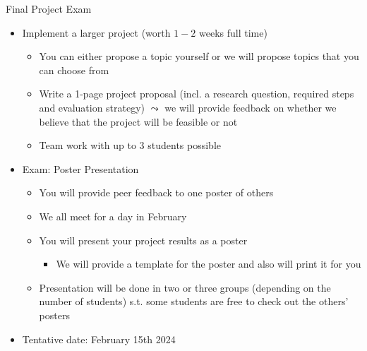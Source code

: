 \documentclass[aspectratio=169, handout]{../latex_main/tntbeamer}  %
\begin{document}
\begin{frame}[c]{Final Project Exam}

\begin{itemize}
  \item Implement a larger project (worth $1-2$ weeks full time)
  \begin{itemize}
		\item You can either propose a topic yourself or we will propose topics that you can choose from
            \item Write a 1-page project proposal (incl. a research question, required steps and evaluation strategy) $\leadsto$ we will provide feedback on whether we believe that the project will be feasible or not
 		\item Team work with up to $3$ students possible
  \end{itemize}
  \pause
  \item Exam: Poster Presentation
	\begin{itemize}
            \item You will provide peer feedback to one poster of others
		\item We all meet for a day in February
            \item You will present your project results as a poster
            \begin{itemize}
                \item We will provide a template for the poster and also will print it for you
            \end{itemize}
            \item Presentation will be done in two or three groups (depending on the number of students) s.t. some students are free to check out the others' posters
	\end{itemize}	
  \item Tentative date: February 15th 2024
\end{itemize}

\end{frame}
\end{document}
